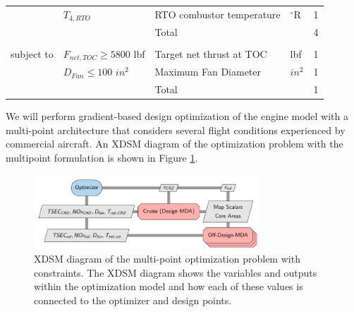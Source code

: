 \documentclass[conf]{new-aiaa}
\begin{document}
\begin{table}[h]
\begin{tabular}{r l l l l}
                        & $T_{4,RTO}$                 & RTO combustor temperature                                  & $^\circ$R             & 1        \\
        \cline{3-5}
                        &                             & Total                                                      &                       & 4        \\
                        &                             &                                                            &                       &          \\
        subject to      & $F_{net,TOC} \geq 5800$ lbf & Target net thrust at TOC                                   & lbf                   & 1        \\
                        & $D_{Fan} \leq 100$ $in^2$   & Maximum Fan Diameter                                       & $in^2$                & 1        \\
        \cline{3-5}
                        &                             & Total                                                      &                       & 1        \\
        \bottomrule
    \end{tabular}
    \label{tab:opt_problem}
\end{table}


We will perform gradient-based design optimization of the engine model with a multi-point architecture that considers several flight conditions experienced by commercial aircraft.
An XDSM diagram of the optimization problem with the multipoint formulation is shown in Figure \ref{fig:opt_prob}.

\begin{figure}[!hbt]
    \centering
    \includegraphics[width=0.75\textwidth]{N3_inject.pdf}
    \caption{XDSM diagram of the multi-point optimization problem with constraints.
        The XDSM diagram shows the variables and outputs within the optimization model and how each of these values is connected to the optimizer and design points.}
    \label{fig:opt_prob}
\end{figure}
\end{document}
